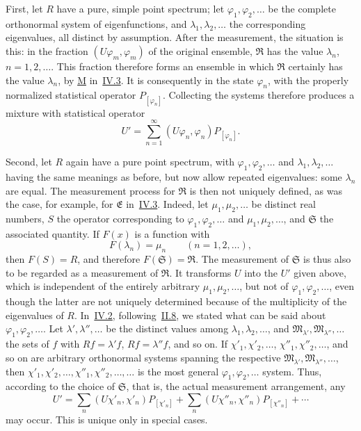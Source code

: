 \documentclass[fontsize=13pt,twoside,openany,headings=normal,parskip=false,bookmarkpackage=false,DIV=calc]{scrbook}
\begin{document}
First, let $R$ have a pure, simple point spectrum; let $\varphi_1,\varphi_2,\ldots$ be the complete orthonormal system of eigenfunctions, and $\lambda_1,\lambda_2,\ldots$ the corresponding eigenvalues, all distinct by assumption. After the measurement, the situation is this: in the fraction $(U\varphi_m,\varphi_m)$ of the original ensemble, $\mathfrak R$ has the value $\lambda_n$, $n=1,2,\ldots$. This fraction therefore forms an ensemble in which $\mathfrak R$ certainly has the value $\lambda_n$, by \hyperref[post:IV.3.M]{M} in~\hyperref[sec:IV.3]{IV.3}. It is consequently in the state $\varphi_n$, with the properly normalized statistical operator $P_{[\varphi_n]}$. Collecting the systems therefore produces a mixture with statistical operator
\[
U'=\sum_{n=1}^{\infty}(U\varphi_n,\varphi_n)P_{[\varphi_n]}.
\]

Second, let $R$ again have a pure point spectrum, with $\varphi_1,\varphi_2,\ldots$ and $\lambda_1,\lambda_2,\ldots$ having the same meanings as before, but now allow repeated eigenvalues: some $\lambda_n$ are equal. The measurement process for $\mathfrak R$ is then not uniquely defined, as was the case, for example, for $\mathfrak E$ in~\hyperref[sec:IV.3]{IV.3}. Indeed, let $\mu_1,\mu_2,\ldots$ be distinct real numbers, $S$ the operator corresponding to $\varphi_1,\varphi_2,\ldots$ and $\mu_1,\mu_2,\ldots$, and $\mathfrak S$ the associated quantity. If $F(x)$ is a function with
\[
F(\lambda_n)=\mu_n\qquad(n=1,2,\ldots),
\]
then $F(S)=R$, and therefore $F(\mathfrak S)=\mathfrak R$. The measurement of $\mathfrak S$ is thus also to be regarded as a measurement of $\mathfrak R$. It transforms $U$ into the $U'$ given above,
\hypertarget{origpage-185}{}%
which is independent of the entirely arbitrary $\mu_1,\mu_2,\ldots$, but not of $\varphi_1,\varphi_2,\ldots$, even though the latter are not uniquely determined because of the multiplicity of the eigenvalues of $R$. In~\hyperref[sec:IV.2]{IV.2}, following~\hyperref[sec:II.8]{II.8}, we stated what can be said about $\varphi_1,\varphi_2,\ldots$. Let $\lambda',\lambda'',\ldots$ be the distinct values among $\lambda_1,\lambda_2,\ldots$, and $\mathfrak M_{\lambda'},\mathfrak M_{\lambda''},\ldots$ the sets of $f$ with $Rf=\lambda'f$, $Rf=\lambda''f$, and so on. If $\chi'_1,\chi'_2,\ldots$, $\chi''_1,\chi''_2,\ldots$, and so on are arbitrary orthonormal systems spanning the respective $\mathfrak M_{\lambda'},\mathfrak M_{\lambda''},\ldots$, then $\chi'_1,\chi'_2,\ldots,\chi''_1,\chi''_2,\ldots,\ldots$ is the most general $\varphi_1,\varphi_2,\ldots$ system. Thus, according to the choice of $\mathfrak S$, that is, the actual measurement arrangement, any
\[
U'=\sum_n(U\chi'_n,\chi'_n)P_{[\chi'_n]}
+\sum_n(U\chi''_n,\chi''_n)P_{[\chi''_n]}+\cdots
\]
may occur. This is unique only in special cases.
\end{document}

